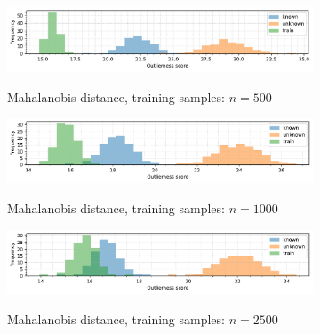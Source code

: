 \begin{figure}[t]
    \centering
    \begin{subfigure}[b]{\textwidth}
        \centering
        \caption{\small Mahalanobis distance, training samples: $n = 500$}
        \includegraphics[width=\textwidth]{images/distributions/hists-md-samples/hist-distributions-dimension_250-samples_500-distance_8-distribution_uniform-model_MD-seed_0.pdf}
        \label{fig:hists-md-500}
    \end{subfigure}
    \begin{subfigure}[b]{\textwidth}
        \centering
        \caption{\small Mahalanobis distance, training samples: $n = 1000$}
        \includegraphics[width=\textwidth]{images/distributions/hists-md-samples/hist-distributions-dimension_250-samples_1000-distance_8-distribution_uniform-model_MD-seed_0.pdf}
        \label{fig:hists-md-1000}
    \end{subfigure}
    \begin{subfigure}[b]{\textwidth}
        \centering
        \caption{\small Mahalanobis distance, training samples: $n = 2500$}
        \includegraphics[width=\textwidth]{images/distributions/hists-md-samples/hist-distributions-dimension_250-samples_2500-distance_8-distribution_uniform-model_MD-seed_0.pdf}
        \label{fig:hists-md-2500}
    \end{subfigure}
    \begin{subfigure}[b]{\textwidth}

\end{subfigure}
\end{figure}
